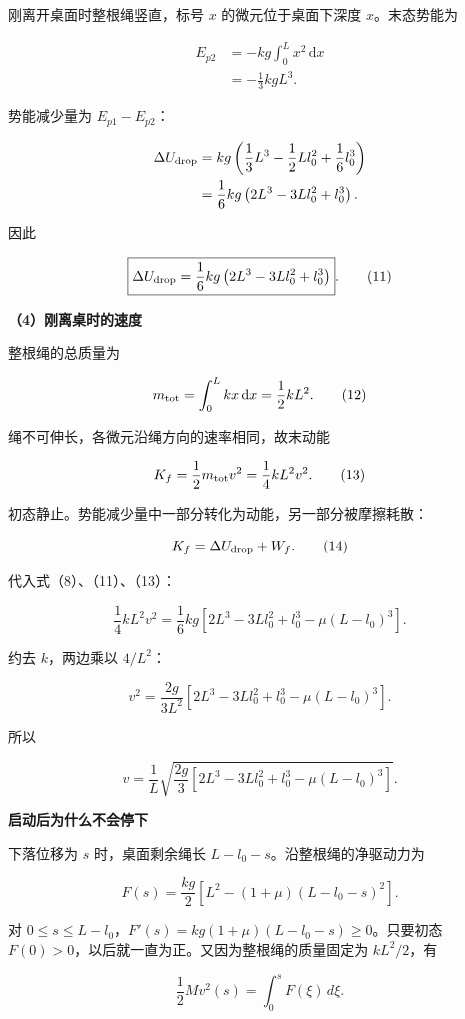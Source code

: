 \documentclass[12pt,a4paper,UTF8]{ctexart}
\begin{document}
刚离开桌面时整根绳竖直，标号 \(x\) 的微元位于桌面下深度
\(x\)。末态势能为

\[
\begin{aligned}
E_{p2}
&=-kg\int_0^Lx^2\,\mathrm dx\\
&=-\frac13kgL^3.
\end{aligned}
\tag{10}
\]

势能减少量为 \(E_{p1}-E_{p2}\)：

\[
\begin{aligned}
\Delta U_{\rm drop}
&=kg\left(
\frac13L^3-\frac12Ll_0^2+\frac16l_0^3
\right)\\
&=\frac16kg
\left(2L^3-3Ll_0^2+l_0^3\right).
\end{aligned}
\]

因此

\[
\boxed{\Delta U_{\rm drop}
=\frac16kg
\left(2L^3-3Ll_0^2+l_0^3\right)}.
\tag{11}
\]

\textbf{（4）刚离桌时的速度}

整根绳的总质量为

\[
m_{\rm tot}
=\int_0^Lkx\,\mathrm dx
=\frac12kL^2.
\tag{12}
\]

绳不可伸长，各微元沿绳方向的速率相同，故末动能

\[
K_f
=\frac12m_{\rm tot}v^2
=\frac14kL^2v^2.
\tag{13}
\]

初态静止。势能减少量中一部分转化为动能，另一部分被摩擦耗散：

\[
K_f=\Delta U_{\rm drop}+W_f.
\tag{14}
\]

代入式（8）、（11）、（13）：

\[
\frac14kL^2v^2
=\frac16kg
\left[
2L^3-3Ll_0^2+l_0^3-\mu(L-l_0)^3
\right].
\]

约去 \(k\)，两边乘以 \(4/L^2\)：

\[
v^2
=\frac{2g}{3L^2}
\left[
2L^3-3Ll_0^2+l_0^3-\mu(L-l_0)^3
\right].
\]

所以

\[
\boxed{
v=\frac1L
\sqrt{\frac{2g}{3}
\left[
2L^3-3Ll_0^2+l_0^3-\mu(L-l_0)^3
\right]}
}.
\tag{15}
\]

\textbf{启动后为什么不会停下}

下落位移为 \(s\) 时，桌面剩余绳长 \(L-l_0-s\)。沿整根绳的净驱动力为

\[F(s)=\frac{kg}{2}\left[L^2-(1+\mu)(L-l_0-s)^2\right].\]

对 \(0\le s\le L-l_0\)，\(F'(s)=kg(1+\mu)(L-l_0-s)\ge0\)。只要初态
\(F(0)>0\)，以后就一直为正。又因为整根绳的质量固定为 \(kL^2/2\)，有

\[\frac12M v^2(s)=\int_0^sF(\xi)\,d\xi.\]
\end{document}
